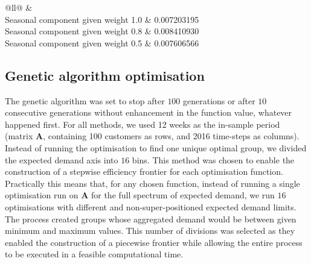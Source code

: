 \documentclass[preprint,3p,12pt,authoryear]{elsarticle}
\begin{document}
\begin{table}[]
	\centering
	\caption{Results for SS function running with different configuration on weights given to bi-objective function}
	\label{tb_ssmix_r}
	\begin{tabular}{@{}ll@{}}
	\toprule
	 &  \\ \midrule
	Seasonal component given weight 1.0                                                                            & 0.007203195                               	\\
	Seasonal component given weight 0.8                                                                            & 0.008410930                               	\\
	Seasonal component given weight 0.5                                                                            & 0.007606566                               	\\ \bottomrule
	\end{tabular}
\end{table}

\subsection{Genetic algorithm optimisation}
\label{ss:genoud}

The genetic algorithm was set to stop after $100$ generations or after $10$ consecutive generations without enhancement in the function value, whatever happened first.
For all methods, we used 12 weeks as the in-sample period (matrix $\bm{A}$, containing 100 customers as rows, and 2016 time-steps as columns).
Instead of running the optimisation to find one unique optimal group, we divided the expected demand axis into $16$ bins.
This method was chosen to enable the construction of a stepwise efficiency frontier for each optimisation function.
Practically this means that, for any chosen function, instead of running a single optimisation run on $\bm{A}$ for the full spectrum of expected demand, we run $16$ optimisations with different and non-super-positioned expected demand limits.
The process created groups whose aggregated demand would be between given minimum and maximum values.
This number of divisions was selected as they enabled the construction of a piecewise frontier while allowing the entire process to be executed in a feasible computational time.
\end{document}
